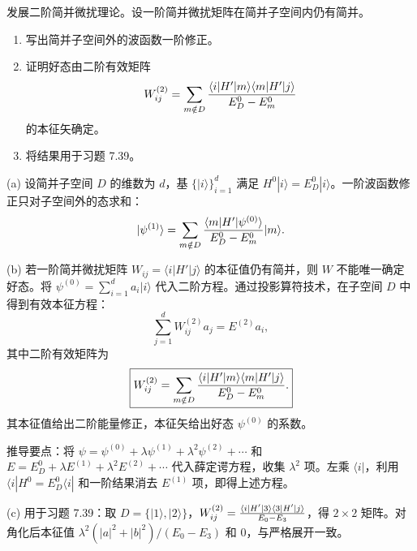 \begin{question}
发展二阶简并微扰理论。设一阶简并微扰矩阵在简并子空间内仍有简并。
\begin{enumerate}
\item 写出简并子空间外的波函数一阶修正。
\item 证明好态由二阶有效矩阵
\[
W^{(2)}_{ij}=\sum_{m\notin D}{\langle i|H'|m\rangle\langle m|H'|j\rangle\over E_D^0-E_m^0}
\]
的本征矢确定。
\item 将结果用于习题 7.39。
\end{enumerate}
\end{question}
\begin{solution}
(a) 设简并子空间 $D$ 的维数为 $d$，基 $\{|i\rangle\}_{i=1}^d$ 满足 $H^0|i\rangle=E_D^0|i\rangle$。一阶波函数修正只对子空间外的态求和：
\[
|\psi^{(1)}\rangle = \sum_{m\notin D} {\langle m|H'|\psi^{(0)}\rangle\over E_D^0-E_m^0}|m\rangle.
\]

(b) 若一阶简并微扰矩阵 $W_{ij}=\langle i|H'|j\rangle$ 的本征值仍有简并，则 $W$ 不能唯一确定好态。将 $\psi^{(0)}=\sum_{i=1}^d a_i|i\rangle$ 代入二阶方程。通过投影算符技术，在子空间 $D$ 中得到有效本征方程：
\[
\sum_{j=1}^d W^{(2)}_{ij} a_j = E^{(2)} a_i,
\]
其中二阶有效矩阵为
\[
\boxed{W^{(2)}_{ij} = \sum_{m\notin D} {\langle i|H'|m\rangle\langle m|H'|j\rangle\over E_D^0 - E_m^0}.}
\]
其本征值给出二阶能量修正，本征矢给出好态 $\psi^{(0)}$ 的系数。

推导要点：将 $\psi=\psi^{(0)}+\lambda\psi^{(1)}+\lambda^2\psi^{(2)}+\cdots$ 和 $E=E_D^0+\lambda E^{(1)}+\lambda^2 E^{(2)}+\cdots$ 代入薛定谔方程，收集 $\lambda^2$ 项。左乘 $\langle i|$，利用 $\langle i|H^0=E_D^0\langle i|$ 和一阶结果消去 $E^{(1)}$ 项，即得上述方程。

(c) 用于习题 7.39：取 $D=\{|1\rangle,|2\rangle\}$，$W^{(2)}_{ij}={\langle i|H'|3\rangle\langle 3|H'|j\rangle\over E_0-E_3}$，得 $2\times2$ 矩阵。对角化后本征值 $\lambda^2(|a|^2+|b|^2)/(E_0-E_3)$ 和 $0$，与严格展开一致。
\end{solution}

